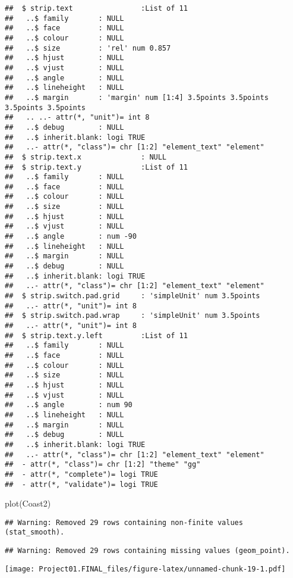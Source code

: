 \documentclass[
]{article}
\newenvironment{Shaded}{\begin{snugshade}}{\end{snugshade}}
\newcommand{\FunctionTok}[1]{\textcolor[rgb]{0.00,0.00,0.00}{#1}}
\newcommand{\NormalTok}[1]{#1}
\begin{document}
\begin{verbatim}
##  $ strip.text                :List of 11
##   ..$ family       : NULL
##   ..$ face         : NULL
##   ..$ colour       : NULL
##   ..$ size         : 'rel' num 0.857
##   ..$ hjust        : NULL
##   ..$ vjust        : NULL
##   ..$ angle        : NULL
##   ..$ lineheight   : NULL
##   ..$ margin       : 'margin' num [1:4] 3.5points 3.5points 3.5points 3.5points
##   .. ..- attr(*, "unit")= int 8
##   ..$ debug        : NULL
##   ..$ inherit.blank: logi TRUE
##   ..- attr(*, "class")= chr [1:2] "element_text" "element"
##  $ strip.text.x              : NULL
##  $ strip.text.y              :List of 11
##   ..$ family       : NULL
##   ..$ face         : NULL
##   ..$ colour       : NULL
##   ..$ size         : NULL
##   ..$ hjust        : NULL
##   ..$ vjust        : NULL
##   ..$ angle        : num -90
##   ..$ lineheight   : NULL
##   ..$ margin       : NULL
##   ..$ debug        : NULL
##   ..$ inherit.blank: logi TRUE
##   ..- attr(*, "class")= chr [1:2] "element_text" "element"
##  $ strip.switch.pad.grid     : 'simpleUnit' num 3.5points
##   ..- attr(*, "unit")= int 8
##  $ strip.switch.pad.wrap     : 'simpleUnit' num 3.5points
##   ..- attr(*, "unit")= int 8
##  $ strip.text.y.left         :List of 11
##   ..$ family       : NULL
##   ..$ face         : NULL
##   ..$ colour       : NULL
##   ..$ size         : NULL
##   ..$ hjust        : NULL
##   ..$ vjust        : NULL
##   ..$ angle        : num 90
##   ..$ lineheight   : NULL
##   ..$ margin       : NULL
##   ..$ debug        : NULL
##   ..$ inherit.blank: logi TRUE
##   ..- attr(*, "class")= chr [1:2] "element_text" "element"
##  - attr(*, "class")= chr [1:2] "theme" "gg"
##  - attr(*, "complete")= logi TRUE
##  - attr(*, "validate")= logi TRUE
\end{verbatim}

\begin{Shaded}
\begin{Highlighting}[]
\FunctionTok{plot}\NormalTok{(Coast2)}
\end{Highlighting}
\end{Shaded}

\begin{verbatim}
## Warning: Removed 29 rows containing non-finite values (stat_smooth).
\end{verbatim}

\begin{verbatim}
## Warning: Removed 29 rows containing missing values (geom_point).
\end{verbatim}

\texttt{[image: Project01.FINAL\_files/figure-latex/unnamed-chunk-19-1.pdf]}
\end{document}
